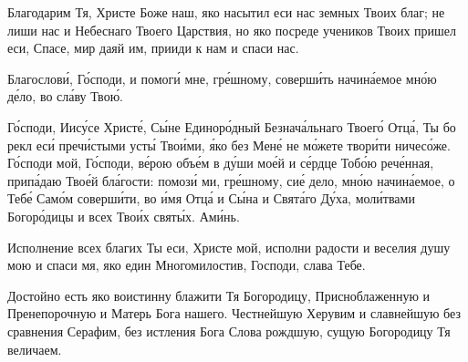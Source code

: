 Благодарим Тя, Христе Боже наш, яко насытил еси нас земных Твоих благ; не лиши нас и Небеснаго Твоего Царствия, но яко посреде учеников Твоих пришел еси, Спасе, мир даяй им, прииди к нам и спаси нас.


\mychapterending


\begin{mymulticols}

\TsariuNebesnyj

Благослов\'{и}, Г\'{о}споди, и помог\'{и} мне, гр\'{е}шному, соверш\'{и}ть начин\'{а}емое мн\'{о}ю д\'{е}ло, во сл\'{а}ву Тво\'{ю}.


Г\'{о}споди, Иис\'{у}се Христ\'{е}, С\'{ы}не Единор\'{о}дный Безнач\'{а}льнаго Твоег\'{о} Отц\'{а}, Ты бо рекл ес\'{и} преч\'{и}стыми уст\'{ы} Тво\'{и}ми, \'{я}ко без Мен\'{е} не м\'{о}жете твор\'{и}ти ничес\'{о}же. Г\'{о}споди мой, Г\'{о}споди, в\'{е}рою объ\'{е}м в д\'{у}ши мо\'{е}й и с\'{е}рдце Тоб\'{о}ю реч\'{е}нная, прип\'{а}даю Тво\'{е}й бл\'{а}гости: помоз\'{и} ми, гр\'{е}шному, си\'{е} дело, мн\'{о}ю начин\'{а}емое, о Теб\'{е} Сам\'{о}м соверш\'{и}ти, во \'{и}мя Отц\'{а} и С\'{ы}на и Свят\'{а}го Д\'{у}ха, мол\'{и}твами Богор\'{о}дицы и всех Тво\'{и}х свят\'{ы}х. Ам\'{и}нь.

\end{mymulticols}

\mychapterending


\begin{mymulticols}




Исполнение всех благих Ты еси, Христе мой, исполни радости и веселия душу мою и спаси мя, яко един Многомилостив, Господи, слава Тебе.


Достойно есть яко воистинну блажити Тя Богородицу, Присноблаженную и Пренепорочную и Матерь Бога нашего. Честнейшую Херувим и славнейшую без сравнения Серафим, без истления Бога Слова рождшую, сущую Богородицу Тя величаем.

\end{mymulticols}

\mychapterending


